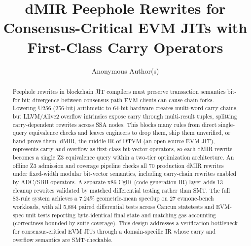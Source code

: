 \documentclass[runningheads]{llncs}
\begin{document}
\title{dMIR Peephole Rewrites for Consensus-Critical EVM JITs with First-Class Carry Operators}


\author{Anonymous Author(s)}

\maketitle

\begin{abstract}
Peephole rewrites in blockchain JIT compilers must preserve transaction semantics bit-for-bit; divergence between consensus-path EVM clients can cause chain forks. Lowering U256 (256-bit) arithmetic to 64-bit hardware creates multi-word carry chains, but LLVM/Alive2 overflow intrinsics expose carry through multi-result tuples, splitting carry-dependent rewrites across SSA nodes. This blocks many rules from direct single-query equivalence checks and leaves engineers to drop them, ship them unverified, or hand-prove them. dMIR, the middle IR of DTVM (an open-source EVM JIT), represents carry and overflow as first-class bit-vector operators, so each dMIR rewrite becomes a single Z3 equivalence query within a two-tier optimization architecture. An offline Z3 admission and coverage pipeline checks all 70 production dMIR rewrites under fixed-width modular bit-vector semantics, including carry-chain rewrites enabled by ADC/SBB operators. A separate x86 CgIR (code-generation IR) layer adds 13 cleanup rewrites validated by matched differential testing rather than SMT. The full 83-rule system achieves a 7.24\% geometric-mean speedup on 27 evmone-bench workloads, with all 5{,}884 paired differential tests across Cancun statetests and EVM-spec unit tests reporting byte-identical final state and matching gas accounting (correctness bounded by suite coverage). This design addresses a verification bottleneck for consensus-critical EVM JITs through a domain-specific IR whose carry and overflow semantics are SMT-checkable.

\end{abstract}
\end{document}
